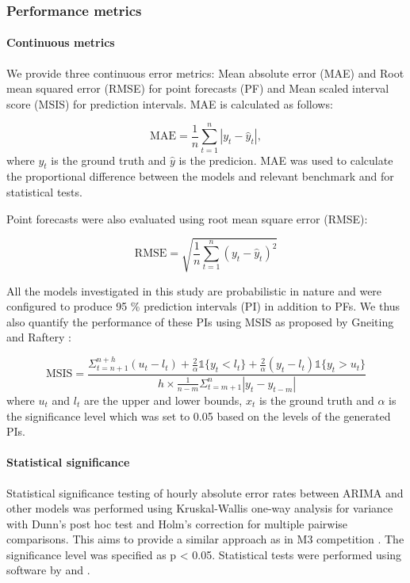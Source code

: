 \subsubsection{Performance metrics}
\paragraph{Continuous metrics } We provide three continuous error metrics: Mean absolute error (MAE) and Root mean squared error (RMSE) for point forecasts (PF) and Mean scaled interval score (MSIS) for prediction intervals. MAE is calculated as follows:

\begin{equation}
	\mathrm{MAE} = \frac{1}{n} \sum_{t=1}^{n} |y_t - \hat{y}_t|,
\end{equation}
where $y_t$ is the ground truth and $\hat{y}$ is the predicion. MAE was used to calculate the proportional difference between the models and relevant benchmark and for statistical tests.

Point forecasts were also evaluated using root mean square error (RMSE):

\begin{equation}
\mathrm{RMSE} = \sqrt{\frac{1}{n}\sum_{t=1}^{n}(y_t-\hat{y}_t)^2}
\end{equation}

All the models investigated in this study are probabilistic in nature and were configured to produce 95 \% prediction intervals (PI) in addition to PFs. We thus also quantify the performance of these PIs using MSIS as proposed by Gneiting and Raftery \cite{Gneiting2007}:

\begin{equation}
\mathrm{MSIS} = \frac{\Sigma_{t=n+1}^{n+h}(u_{t}-l_{t})+\frac{2}{\alpha}\mathbb{1}\{y_{t}<l_{t}\}+\frac{2}{\alpha}(y_{t}-l_{t})\mathbb{1}\{y_{t}>u_{t}\}}{h \times \frac{1}{n-m}\Sigma_{t=m+1}^{n}|y_{t}-y_{t-m}|}
\end{equation}
where $u_t$ and $l_t$ are the upper and lower bounds, $x_t$ is the ground truth and $\alpha$ is the significance level which was set to 0.05 based on the levels of the generated PIs.



\paragraph{Statistical significance} Statistical significance testing of hourly absolute error rates between ARIMA and other models was performed using Kruskal-Wallis one-way analysis for variance with Dunn's post hoc test and Holm's correction for multiple pairwise comparisons. This aims to provide a similar approach as in M3 competition \cite{Koning2005}. The significance level was specified as p < 0.05. Statistical tests were performed using software by \citet{Scipy} and \citet{Terpilowski2019}.


